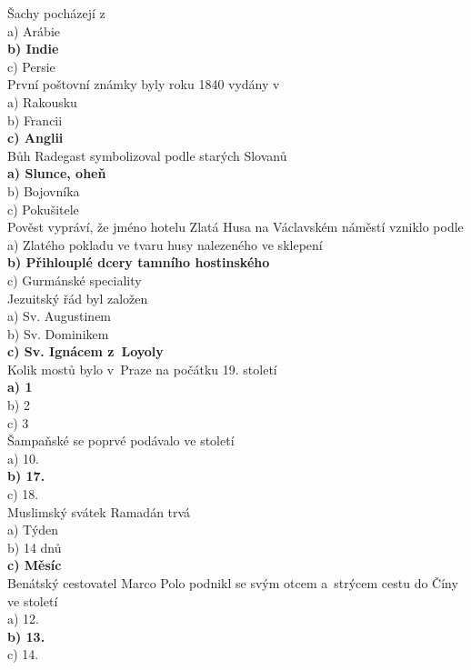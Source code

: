 \begin{multicols}{4}
\noindent
Šachy pocházejí z \\
a) Arábie\\
\textbf{b) Indie}\\
c) Persie\\

\noindent
První poštovní známky byly roku 1840 vydány v \\
a) Rakousku\\
b) Francii\\
\textbf{c) Anglii}\\

\noindent
Bůh Radegast symbolizoval podle starých Slovanů \\
\textbf{a) Slunce, oheň}\\
b) Bojovníka\\
c) Pokušitele\\

\noindent
Pověst vypráví, že jméno hotelu Zlatá Husa na Václavském náměstí 
vzniklo podle \\
a) Zlatého pokladu ve tvaru husy nalezeného ve sklepení\\
\textbf{b) Přihlouplé dcery tamního hostinského}\\
c) Gurmánské speciality\\

\noindent
Jezuitský řád byl založen \\
a) Sv. Augustinem\\
b) Sv. Dominikem\\
\textbf{c) Sv. Ignácem z~Loyoly}\\

\noindent
Kolik mostů bylo v~Praze na počátku 19. století\\
\textbf{a) 1}\\
b) 2\\
c) 3\\

\noindent
Šampaňské se poprvé podávalo ve století \\
a) 10.\\
\textbf{b) 17.}\\
c) 18.\\

\noindent
Muslimský svátek Ramadán trvá\\
a) Týden\\
b) 14 dnů\\
\textbf{c) Měsíc}\\

\noindent
Benátský cestovatel Marco Polo podnikl se svým otcem a~strýcem 
cestu do Číny ve století\\
a) 12.\\
\textbf{b) 13.}\\
c) 14.\\


\end{multicols}
